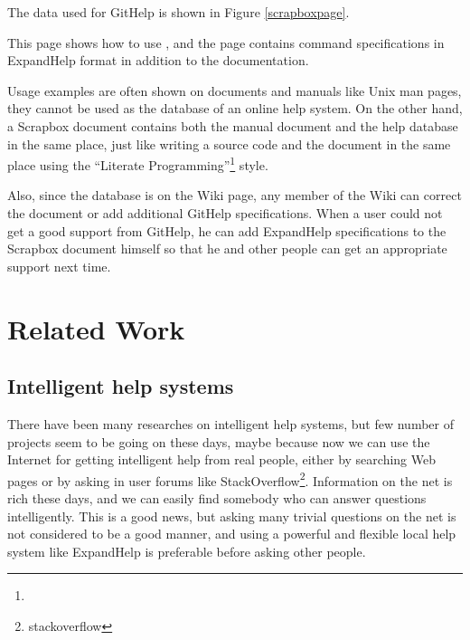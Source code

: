 \documentclass{sigchi}
\def\GH{\textsf{GitHelp}}
\def\SB{\textsf{Scrapbox}}
\def\EH{\textsf{ExpandHelp}}
\begin{document}
The data used for {\GH} is shown in Figure \ref{scrapboxpage}.


This page shows how to use , and
the page contains command specifications in {\EH} format
in addition to the documentation.


Usage examples are often shown on documents and manuals like Unix man pages,
they cannot be used as the database of an online help system.
On the other hand,
a {\SB} document contains both the manual document and the help database
in the same place, just like
writing a source code and the document in the same place
using the ``Literate Programming''\footnote{
} style.

Also, since the database is on the Wiki page, any member of the
Wiki can correct the document or add additional {\GH} specifications.
When a user could not get a good support from {\GH}, he can add
{\EH} specifications to the {\SB} document himself
so that he and other people can get an appropriate support next time.

\section{Related Work}

\subsection{Intelligent help systems}

There have been many researches on intelligent help systems\cite{Delisle:2002:UIH:606412.606415},
but few number of projects seem to be going on these days,
maybe because now we can use the Internet for getting intelligent help from
real people,
either by searching Web pages or 
by asking in user forums like StackOverflow\footnote{stackoverflow}.
Information on the net is rich these days, and we can easily
find somebody who can answer questions intelligently.
This is a good news, but 
asking many trivial questions on the net is not considered to be a
good manner, and
using a powerful and flexible local help system like {\EH} is
preferable before asking other people.
\end{document}

